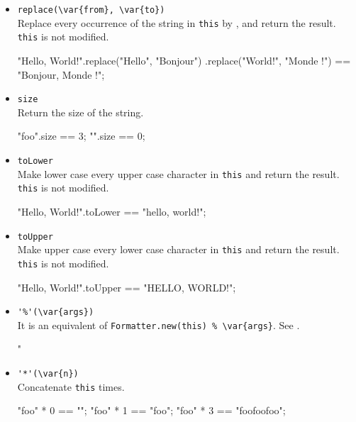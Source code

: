 \begin{itemize}
\item \lstinline|replace(\var{from}, \var{to})|\\
  Replace every occurrence of the string  in
  \lstinline|this| by , and return the result.
  \lstinline|this| is not modified.
\begin{urbiassert}
"Hello, World!".replace("Hello", "Bonjour")
                      .replace("World!", "Monde !") ==
       "Bonjour, Monde !";
\end{urbiassert}

\item \lstinline|size|\\
  Return the size of the string.
\begin{urbiassert}
"foo".size == 3;
"".size == 0;
\end{urbiassert}

\item \lstinline|toLower|\\
  Make lower case every upper case character in \lstinline|this| and
  return the result.  \lstinline|this| is not modified.
\begin{urbiassert}
"Hello, World!".toLower == "hello, world!";
\end{urbiassert}

\item \lstinline|toUpper|\\
  Make upper case every lower case character in \lstinline|this| and
  return the result.  \lstinline|this| is not modified.
\begin{urbiassert}
"Hello, World!".toUpper == "HELLO, WORLD!";
\end{urbiassert}

\item \lstinline|'%'(\var{args})|\\
  It is an equivalent of \lstinline|Formatter.new(this) % \var{args}|.
  See .
\begin{urbiassert}
"%
\end{urbiassert}

\item \lstinline|'*'(\var{n})|\\
  Concatenate \lstinline|this|  times.
\begin{urbiassert}
"foo" * 0 == "";
"foo" * 1 == "foo";
"foo" * 3 == "foofoofoo";
\end{urbiassert}


\end{itemize}

